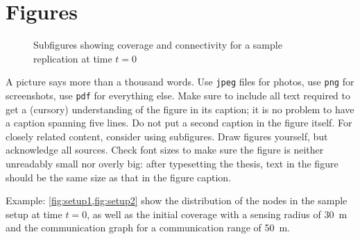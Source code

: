 \documentclass[]{ccs-thesis}
\begin{document}
\section{Figures}

\begin{figure}%
	\centering
	\caption{Subfigures showing coverage and connectivity for a sample replication at time $t=0$}%
	\label{fig:setups12}%
\end{figure}

A picture says more than a thousand words.
Use \texttt{jpeg} files for photos, use \texttt{png} for screenshots, use \texttt{pdf} for everything else.
Make sure to include all text required to get a (cursory) understanding of the figure in its caption; it is no problem to have a caption spanning five lines.
Do not put a second caption in the figure itself.
For closely related content, consider using subfigures.
Draw figures yourself, but acknowledge all sources.
Check font sizes to make sure the figure is neither unreadably small nor overly big: after typesetting the thesis, text in the figure should be the same size as that in the figure caption.

Example: \cref{fig:setup1,fig:setup2} show the distribution of the nodes in the sample setup at time $t=0$, as well as the initial coverage with a sensing radius of \SI{30}{\metre} and the communication graph for a communication range of \SI{50}{\metre}.
\end{document}
